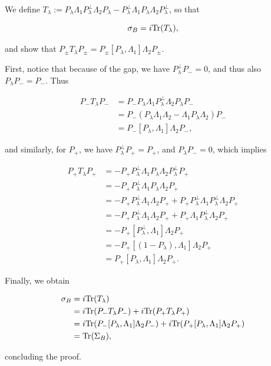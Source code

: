 \documentclass[12pt, letterpaper]{article}
\begin{document}
We define $T_\lambda := P_\lambda\Lambda_1 P_\lambda^\perp \Lambda_2P_\lambda -  P_\lambda^\perp \Lambda_1 P_\lambda\Lambda_2P_\lambda^\perp$, so that

\[\sigma_B = i\text{Tr}(T_\lambda),\]

and show that $P_\pm T_\lambda P_\pm = P_\pm [P_\lambda, \Lambda_1]\Lambda_2 P_\pm$. 

First, notice that because of the gap, we have $P_\lambda^\perp P_- = 0$, and thus also $P_\lambda P_- = P_-$. Thus

\[\begin{aligned}
P_- T_\lambda P_- &=  P_-P_\lambda \Lambda_1 P_\lambda^\perp \Lambda_2 P_\lambda P_-\\
&= P_-(P_\lambda\Lambda_1\Lambda_2 - \Lambda_1P_\lambda\Lambda_2)P_-\\
&= P_-[P_\lambda,\Lambda_1]\Lambda_2 P_-,
\end{aligned}\]

and similarly, for $P_+$, we have $P_\lambda^\perp P_+ = P_+$, and $P_\lambda P_- = 0$, which implies

\[\begin{aligned}
P_+ T_\lambda P_+ &=  -P_+P_\lambda^\perp \Lambda_1 P_\lambda \Lambda_2 P_\lambda^\perp P_+\\
&= -P_+P_\lambda^\perp\Lambda_1P_\lambda\Lambda_2P_+\\
&= -P_+P_\lambda^\perp\Lambda_1\Lambda_2P_+ + P_+P_\lambda^\perp\Lambda_1P_\lambda^\perp\Lambda_2P_+\\
&= -P_+P_\lambda^\perp\Lambda_1\Lambda_2P_+ + P_+\Lambda_1P_\lambda^\perp\Lambda_2P_+\\
&= -P_+[P_\lambda^\perp, \Lambda_1]\Lambda_2 P_+\\
&= -P_+[(1-P_\lambda), \Lambda_1]\Lambda_2 P_+\\
&= P_+[P_\lambda, \Lambda_1]\Lambda_2 P_+.
\end{aligned}\]

Finally, we obtain

\[\begin{aligned}
\sigma_B &= i\text{Tr}(T_\lambda) \\
&=  i\text{Tr}(P_-T_\lambda P_-) + i\text{Tr}(P_+T_\lambda P_+)\\
&= i\text{Tr}(P_-[P_\lambda,\Lambda_1]\Lambda_2 P_-) + i\text{Tr}(P_+[P_\lambda, \Lambda_1]\Lambda_2 P_+)\\
&= \text{Tr}(\Sigma_B),
\end{aligned}\]

concluding the proof.
\end{document}
